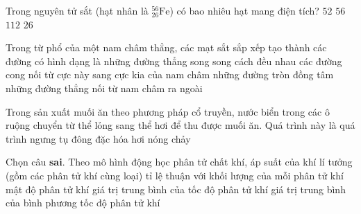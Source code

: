 	\begin{ex}%
		Trong nguyên tử sắt (hạt nhân là ${}^{56}_{26}\text{Fe}$) có bao nhiêu hạt mang điện tích?
		\choice
		{\True $52$}
		{$56$}
		{$112$}
		{$26$}
	\end{ex}

	\begin{ex}%
		Trong từ phổ của một nam châm thẳng, các mạt sắt sắp xếp tạo thành các đường có hình dạng là
		\choice
		{những đường thẳng song song cách đều nhau}
		{\True các đường cong nối từ cực này sang cực kia của nam châm}
		{những đường tròn đồng tâm}
		{những đường thẳng nối từ nam châm ra ngoài}
	\end{ex}

	\begin{ex}%
		Trong sản xuất muối ăn theo phương pháp cổ truyền, nước biển trong các ô ruộng chuyển từ thể lỏng sang thể hơi để thu được muối ăn. Quá trình này là quá trình
		\choice
		{ngưng tụ}
		{đông đặc}
		{\True hóa hơi}
		{nóng chảy}
	\end{ex}

	\begin{ex}%
		Chọn câu \textbf{sai}. Theo mô hình động học phân tử chất khí, áp suất của khí lí tưởng (gồm các phân tử khí cùng loại) tỉ lệ thuận với
		\choice
		{khối lượng của mỗi phân tử khí}
		{mật độ phân tử khí}
		{\True giá trị trung bình của tốc độ phân tử khí}
		{giá trị trung bình của bình phương tốc độ phân tử khí}
	\end{ex}

